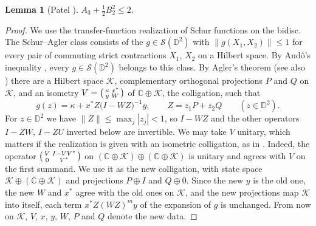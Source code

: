 \documentclass[11pt]{amsart}
\newtheorem{lemma}[theorem]{Lemma}
\theoremstyle{remark}
\numberwithin{equation}{section}
\newcommand{\C}{\mathbb{C}}
\newcommand{\D}{\mathbb{D}}
\begin{document}
\begin{lemma}[Patel {\cite{PatMDB}}]\label{lem:couple}
$A_3+\tfrac12B_2^2\le2$.
\end{lemma}

\begin{proof}
We use the transfer-function realization of Schur functions on the bidisc. The Schur--Agler class consists of the $g\in\mathcal S(\D^2)$ with $\|g(X_1,X_2)\|\le1$ for every pair of commuting strict contractions $X_1$, $X_2$ on a Hilbert space. By And\^o's inequality \cite{And63}, every $g\in\mathcal S(\D^2)$ belongs to this class. By Agler's theorem \cite{Agl90} (see also \cite{BT98,AM02}) there are a Hilbert space $\mathcal K$, complementary orthogonal projections $P$ and $Q$ on $\mathcal K$, and an isometry $V=\begin{psmallmatrix}\kappa&x^*\\y&W\end{psmallmatrix}$ of $\C\oplus\mathcal K$, the colligation, such that
\[
g(z)=\kappa+x^*Z\bigl(I-WZ\bigr)^{-1}y,\qquad Z=z_1P+z_2Q\qquad(z\in\D^2).
\]
For $z\in\D^2$ we have $\|Z\|\le\max_j|z_j|<1$, so $I-WZ$ and the other operators $I-ZW$, $I-ZU$ inverted below are invertible.
We may take $V$ unitary, which matters if the realization is given with an isometric colligation, as in \cite[Section~2]{Kne25}. Indeed, the operator $\begin{psmallmatrix}V&I-VV^*\\0&V^*\end{psmallmatrix}$ on $(\C\oplus\mathcal K)\oplus(\C\oplus\mathcal K)$ is unitary and agrees with $V$ on the first summand. We use it as the new colligation, with state space $\mathcal K\oplus(\C\oplus\mathcal K)$ and projections $P\oplus I$ and $Q\oplus0$. Since the new $y$ is the old one, the new $W$ and $x^*$ agree with the old ones on $\mathcal K$, and the new projections map $\mathcal K$ into itself, each term $x^*Z(WZ)^my$ of the expansion of $g$ is unchanged. From now on $\mathcal K$, $V$, $x$, $y$, $W$, $P$ and $Q$ denote the new data.


\end{proof}
\end{document}
